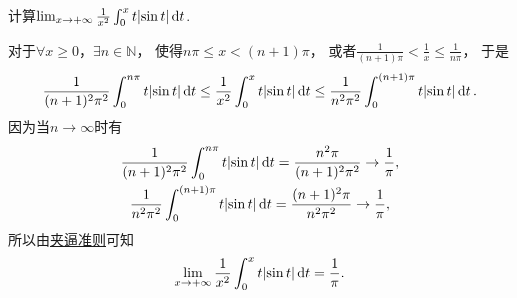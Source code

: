 \begin{example}
计算\(\lim_{x\to+\infty} \frac1{x^2} \int_0^x t \abs{\sin t} \dd{t}\).
\begin{solution}
对于\(\forall x\geq0\)，\(\exists n\in\mathbb{N}\)，
使得\(n\pi \leq x < (n+1)\pi\)，
或者\(\frac1{(n+1)\pi} < \frac1x \leq \frac1{n\pi}\)，
于是\[
	\frac1{(n+1)^2\pi^2} \int_0^{n\pi} t \abs{\sin t} \dd{t}
	\leq \frac1{x^2} \int_0^x t \abs{\sin t} \dd{t}
	\leq \frac1{n^2\pi^2} \int_0^{(n+1)\pi} t \abs{\sin t} \dd{t}.
\]
因为当\(n\to\infty\)时有\begin{gather*}
	\frac1{(n+1)^2\pi^2} \int_0^{n\pi} t \abs{\sin t} \dd{t}
	= \frac{n^2\pi}{(n+1)^2\pi^2}
	\to \frac1\pi, \\
	\frac1{n^2\pi^2} \int_0^{(n+1)\pi} t \abs{\sin t} \dd{t}
	= \frac{(n+1)^2\pi}{n^2\pi^2}
	\to \frac1\pi,
\end{gather*}
所以由\hyperref[theorem:函数极限.夹逼准则]{夹逼准则}可知\[
	\lim_{x\to+\infty} \frac1{x^2} \int_0^x t \abs{\sin t} \dd{t} = \frac1\pi.
\]
\end{solution}
\end{example}

